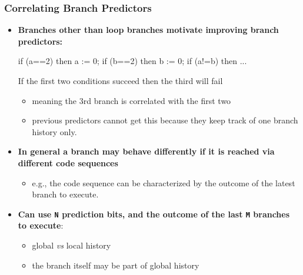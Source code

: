 \documentclass{beamer}
\newcommand{\emp}[1]{\textcolor{DikuRed}{ #1}}
\begin{document}
\begin{frame}[fragile,t]
\frametitle{Correlating Branch Predictors}

\begin{itemize}
    \item \emp{\bf Branches other than loop branches motivate 
                    improving branch predictors:}\medskip
\begin{colorcode}
    if (a==2) then a := 0;
    if (b==2) then b := 0;
    if (a!=b) then ...
\end{colorcode}
\medskip
        If the first two conditions succeed then the third will fail
        \begin{itemize}
            \item meaning the 3rd branch is correlated with the first two
            \item previous predictors cannot get this because they keep
                    track of one branch history only.
        \end{itemize} \medskip


    \item \emp{\bf In general a branch may behave differently if it is
                    reached via different code sequences}
        \begin{itemize}
            \item e.g., the code sequence can be characterized by the outcome
                    of the latest branch to execute.
        \end{itemize}\medskip\pause

    \item \emp{\bf Can use {\tt N} prediction bits, 
                and the outcome of the last {\tt M} branches to execute}:
        \begin{itemize}
            \item global {\em vs} local history
            \item the branch itself may be part of global history
        \end{itemize}
\end{itemize}
\end{frame}
\end{document}
